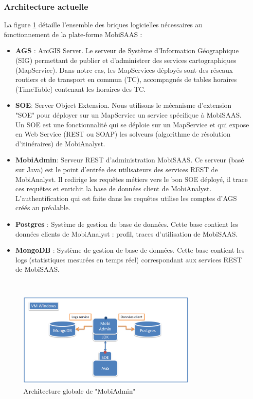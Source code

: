 \subsubsection{Architecture actuelle}

La figure \ref{fig:architecture} détaille l'ensemble des briques logicielles nécessaires au fonctionnement de la plate-forme MobiSAAS :
\begin{itemize}
\item \textbf{AGS} : ArcGIS Server. Le serveur de Système d'Information Géographique (SIG) permettant de publier et d'administrer des services cartographiques (MapService).
Dans notre cas, les MapServices déployés sont des réseaux routiers et de transport en commun (TC), accompagnés de tables horaires (TimeTable) contenant les horaires des TC.
\item \textbf{SOE}: Server Object Extension. Nous utilisons le mécanisme d'extension "SOE" pour déployer sur un MapService un service spécifique à MobiSAAS. Un SOE est une fonctionnalité qui se déploie sur un MapService et qui expose en Web Service (REST ou SOAP) les solveurs (algorithme de résolution d'itinéraires) de MobiAnalyst.
\item \textbf{MobiAdmin}: Serveur REST d'administration MobiSAAS. Ce serveur (basé sur Java) est le point d'entrée des utilisateurs des services REST de MobiAnalyst.
Il redirige les requêtes métiers vers le bon SOE déployé, il trace ces requêtes et enrichit la base de données client de MobiAnalyst.
L'authentification qui est faite dans les requêtes utilise les comptes d'AGS créés au préalable.
\item \textbf{Postgres} : Système de gestion de base de données. Cette base contient les données clients de MobiAnalyst : profil, traces d'utilisation de MobiSAAS.
\item \textbf{MongoDB} : Système de gestion de base de données. Cette base contient les logs (statistiques mesurées en temps réel) correspondant aux services REST de MobiSAAS.
\end{itemize}\\

\begin{figure}[h]
	\centering
		\includegraphics[width=0.8\textwidth]{images/architecture.png}
	\caption{Architecture globale de "MobiAdmin"}
	\label{fig:architecture}
\end{figure}\\

